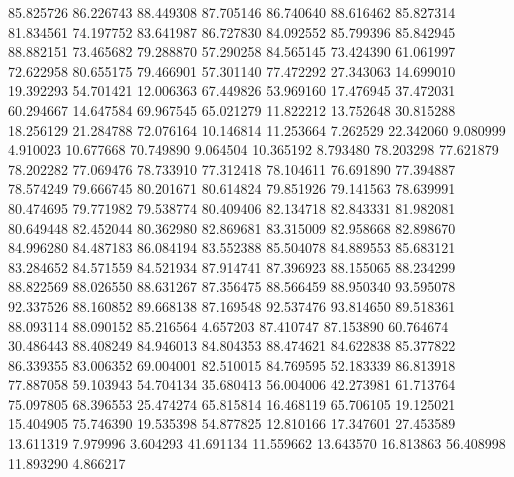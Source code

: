 85.825726
86.226743
88.449308
87.705146
86.740640
88.616462
85.827314
81.834561
74.197752
83.641987
86.727830
84.092552
85.799396
85.842945
88.882151
73.465682
79.288870
57.290258
84.565145
73.424390
61.061997
72.622958
80.655175
79.466901
57.301140
77.472292
27.343063
14.699010
19.392293
54.701421
12.006363
67.449826
53.969160
17.476945
37.472031
60.294667
14.647584
69.967545
65.021279
11.822212
13.752648
30.815288
18.256129
21.284788
72.076164
10.146814
11.253664
7.262529
22.342060
9.080999
4.910023
10.677668
70.749890
9.064504
10.365192
8.793480
78.203298
77.621879
78.202282
77.069476
78.733910
77.312418
78.104611
76.691890
77.394887
78.574249
79.666745
80.201671
80.614824
79.851926
79.141563
78.639991
80.474695
79.771982
79.538774
80.409406
82.134718
82.843331
81.982081
80.649448
82.452044
80.362980
82.869681
83.315009
82.958668
82.898670
84.996280
84.487183
86.084194
83.552388
85.504078
84.889553
85.683121
83.284652
84.571559
84.521934
87.914741
87.396923
88.155065
88.234299
88.822569
88.026550
88.631267
87.356475
88.566459
88.950340
93.595078
92.337526
88.160852
89.668138
87.169548
92.537476
93.814650
89.518361
88.093114
88.090152
85.216564
4.657203
87.410747
87.153890
60.764674
30.486443
88.408249
84.946013
84.804353
88.474621
84.622838
85.377822
86.339355
83.006352
69.004001
82.510015
84.769595
52.183339
86.813918
77.887058
59.103943
54.704134
35.680413
56.004006
42.273981
61.713764
75.097805
68.396553
25.474274
65.815814
16.468119
65.706105
19.125021
15.404905
75.746390
19.535398
54.877825
12.810166
17.347601
27.453589
13.611319
7.979996
3.604293
41.691134
11.559662
13.643570
16.813863
56.408998
11.893290
4.866217
